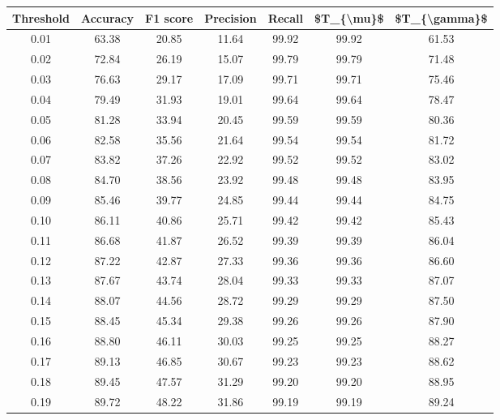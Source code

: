 \begin{tabular}{|c|c|c|c|c|c|c|}
\toprule
 Threshold &  Accuracy &  F1 score &  Precision &  Recall &  \$T\_\{\textbackslash mu\}\$ &  \$T\_\{\textbackslash gamma\}\$ \\
\hline
      0.01 &     63.38 &     20.85 &      11.64 &   99.92 &      99.92 &         61.53 \\
      0.02 &     72.84 &     26.19 &      15.07 &   99.79 &      99.79 &         71.48 \\
      0.03 &     76.63 &     29.17 &      17.09 &   99.71 &      99.71 &         75.46 \\
      0.04 &     79.49 &     31.93 &      19.01 &   99.64 &      99.64 &         78.47 \\
      0.05 &     81.28 &     33.94 &      20.45 &   99.59 &      99.59 &         80.36 \\
      0.06 &     82.58 &     35.56 &      21.64 &   99.54 &      99.54 &         81.72 \\
      0.07 &     83.82 &     37.26 &      22.92 &   99.52 &      99.52 &         83.02 \\
      0.08 &     84.70 &     38.56 &      23.92 &   99.48 &      99.48 &         83.95 \\
      0.09 &     85.46 &     39.77 &      24.85 &   99.44 &      99.44 &         84.75 \\
      0.10 &     86.11 &     40.86 &      25.71 &   99.42 &      99.42 &         85.43 \\
      0.11 &     86.68 &     41.87 &      26.52 &   99.39 &      99.39 &         86.04 \\
      0.12 &     87.22 &     42.87 &      27.33 &   99.36 &      99.36 &         86.60 \\
      0.13 &     87.67 &     43.74 &      28.04 &   99.33 &      99.33 &         87.07 \\
      0.14 &     88.07 &     44.56 &      28.72 &   99.29 &      99.29 &         87.50 \\
      0.15 &     88.45 &     45.34 &      29.38 &   99.26 &      99.26 &         87.90 \\
      0.16 &     88.80 &     46.11 &      30.03 &   99.25 &      99.25 &         88.27 \\
      0.17 &     89.13 &     46.85 &      30.67 &   99.23 &      99.23 &         88.62 \\
      0.18 &     89.45 &     47.57 &      31.29 &   99.20 &      99.20 &         88.95 \\
      0.19 &     89.72 &     48.22 &      31.86 &   99.19 &      99.19 &         89.24 \\

\end{tabular}

